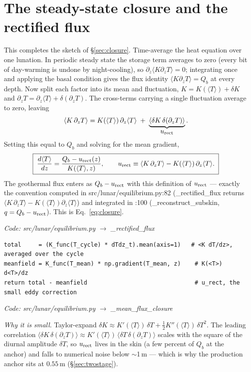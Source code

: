 \documentclass[11pt]{report}
\newcommand{\Tm}{\langle T\rangle}
\newcommand{\code}[1]{{\ttfamily\small #1}}
\begin{document}
\section{The steady-state closure and the rectified flux}\label{app:closure}
This completes the sketch of \S\ref{sec:closure}. Time-average the heat equation
over one lunation. In periodic steady state the storage term averages to zero
(every bit of day-warming is undone by night-cooling), so
$\partial_z\langle K\partial_z T\rangle=0$; integrating once and applying the
basal condition gives the flux identity $\langle K\partial_z T\rangle=Q_b$ at
every depth. Now split each factor into its mean and fluctuation,
$K=K(\Tm)+\delta K$ and $\partial_z T=\partial_z\Tm+\delta(\partial_z T)$. The
cross-terms carrying a single fluctuation average to zero, leaving
\[
\langle K\,\partial_z T\rangle
= K(\Tm)\,\partial_z\Tm \;+\; \underbrace{\langle \delta K\,\delta(\partial_z
T)\rangle}_{\textstyle u_{\rm rect}}.
\]
Setting this equal to $Q_b$ and solving for the mean gradient,
\[
\boxed{\;\frac{d\Tm}{dz}=\frac{Q_b-u_{\rm rect}(z)}{K(\Tm,z)},\qquad
u_{\rm rect}\equiv\langle K\,\partial_z T\rangle-K(\Tm)\,\partial_z\Tm.\;}
\]
The geothermal flux enters as $Q_b-u_{\rm rect}$ with this definition of
$u_{\rm rect}$ --- exactly the convention computed in
\code{src/lunar/equilibrium.py:82} (\code{\_rectified\_flux} returns
$\langle K\,\partial_z T\rangle-K(\Tm)\partial_z\Tm$) and integrated in
\code{:100} (\code{\_reconstruct\_subskin}, $q=Q_b-u_{\rm rect}$). This is
Eq.~\eqref{eq:closure}.

{\small\color{dim}\textit{Code: \code{src/lunar/equilibrium.py} $\to$ \code{\_rectified\_flux}}}
\begin{lstlisting}[style=py]
total     = (K_func(T_cycle) * dTdz_t).mean(axis=1)   # <K dT/dz>, averaged over the cycle
meanfield = K_func(T_mean) * np.gradient(T_mean, z)    # K(<T>) d<T>/dz
return total - meanfield                               # u_rect, the small eddy correction
\end{lstlisting}

{\small\color{dim}\textit{Code: \code{src/lunar/equilibrium.py} $\to$ \code{\_mean\_flux\_closure}}}

\emph{Why it is small.} Taylor-expand $\delta K\approx K'(\Tm)\,\delta T
+\tfrac12 K''(\Tm)\,\delta T^2$. The leading correlation
$\langle\delta K\,\delta(\partial_z T)\rangle\approx
K'(\Tm)\,\langle\delta T\,\delta(\partial_z T)\rangle$ scales with the square of
the diurnal amplitude $\delta T$, so $u_{\rm rect}$ lives in the skin (a few
percent of $Q_b$ at the anchor) and falls to numerical noise below $\sim$1\,m ---
which is why the production anchor sits at $0.55$\,m (\S\ref{sec:twostage}).
\end{document}
